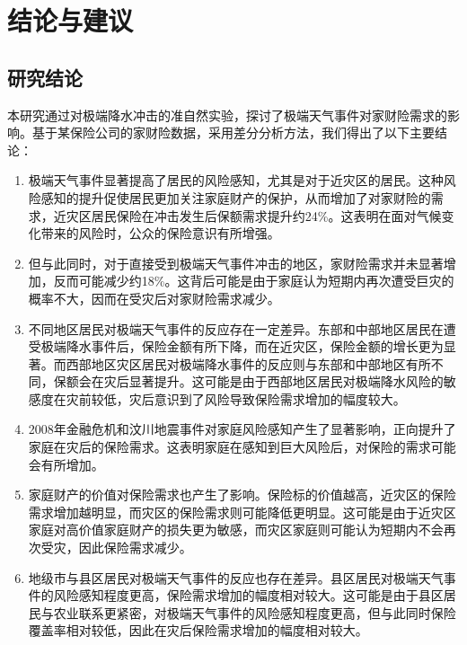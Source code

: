 \chapter{结论与建议}\label{chap:5}

\section{研究结论}

本研究通过对极端降水冲击的准自然实验，探讨了极端天气事件对家财险需求的影响。基于某保险公司的家财险数据，采用差分分析方法，我们得出了以下主要结论：
\begin{enumerate}
    \item 极端天气事件显著提高了居民的风险感知，尤其是对于近灾区的居民。这种风险感知的提升促使居民更加关注家庭财产的保护，从而增加了对家财险的需求，近灾区居民保险在冲击发生后保额需求提升约24\%。这表明在面对气候变化带来的风险时，公众的保险意识有所增强。

    \item 但与此同时，对于直接受到极端天气事件冲击的地区，家财险需求并未显著增加，反而可能减少约18\%。这背后可能是由于家庭认为短期内再次遭受巨灾的概率不大，因而在受灾后对家财险需求减少。

    \item 不同地区居民对极端天气事件的反应存在一定差异。东部和中部地区居民在遭受极端降水事件后，保险金额有所下降，而在近灾区，保险金额的增长更为显著。而西部地区灾区居民对极端降水事件的反应则与东部和中部地区有所不同，保额会在灾后显著提升。这可能是由于西部地区居民对极端降水风险的敏感度在灾前较低，灾后意识到了风险导致保险需求增加的幅度较大。

    \item 2008年金融危机和汶川地震事件对家庭风险感知产生了显著影响，正向提升了家庭在灾后的保险需求。这表明家庭在感知到巨大风险后，对保险的需求可能会有所增加。

    \item 家庭财产的价值对保险需求也产生了影响。保险标的价值越高，近灾区的保险需求增加越明显，而灾区的保险需求则可能降低更明显。这可能是由于近灾区家庭对高价值家庭财产的损失更为敏感，而灾区家庭则可能认为短期内不会再次受灾，因此保险需求减少。

    \item 地级市与县区居民对极端天气事件的反应也存在差异。县区居民对极端天气事件的风险感知程度更高，保险需求增加的幅度相对较大。这可能是由于县区居民与农业联系更紧密，对极端天气事件的风险感知程度更高，但与此同时保险覆盖率相对较低，因此在灾后保险需求增加的幅度相对较大。
\end{enumerate}
